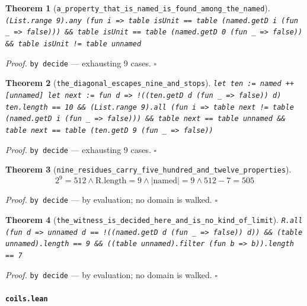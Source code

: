 \documentclass[11pt]{article}
\newtheorem{theorem}{Theorem}[section]
\begin{document}
\begin{theorem}[\texttt{a\_property\_that\_is\_named\_is\_found\_among\_the\_named}]
\texttt{(List.range 9).any (fun i => table isUnit == table (named.getD i (fun \_ => false))) \&\& table isUnit == table (named.getD 0 (fun \_ => false)) \&\& table isUnit != table unnamed}
\end{theorem}
\noindent\emph{Proof.} \texttt{by decide} --- exhausting 9 cases. \hfill$\square$

\begin{theorem}[\texttt{the\_diagonal\_escapes\_nine\_and\_stops}]
\texttt{let ten := named ++ [unnamed] let next := fun d => !((ten.getD d (fun \_ => false)) d) ten.length == 10 \&\& (List.range 9).all (fun i => table next != table (named.getD i (fun \_ => false))) \&\& table next == table unnamed \&\& table next == table (ten.getD 9 (fun \_ => false))}
\end{theorem}
\noindent\emph{Proof.} \texttt{by decide} --- exhausting 9 cases. \hfill$\square$

\begin{theorem}[\texttt{nine\_residues\_carry\_five\_hundred\_and\_twelve\_properties}]
\[ 2^{9} = 512 \land \mathrm{R.length} = 9 \land \left|\mathrm{named}\right| = 9 \land 512 - 7 = 505 \]
\end{theorem}
\noindent\emph{Proof.} \texttt{by decide} --- by evaluation; no domain is walked. \hfill$\square$

\begin{theorem}[\texttt{the\_witness\_is\_decided\_here\_and\_is\_no\_kind\_of\_limit}]
\texttt{R.all (fun d => unnamed d == !((named.getD d (fun \_ => false)) d)) \&\& (table unnamed).length == 9 \&\& ((table unnamed).filter (fun b => b)).length == 7}
\end{theorem}
\noindent\emph{Proof.} \texttt{by decide} --- by evaluation; no domain is walked. \hfill$\square$

\paragraph{\texttt{coils.lean}}
\end{document}
